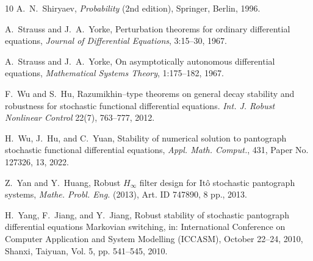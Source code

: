 \documentclass[a4paper,10pt,reqno]{amsart}
\numberwithin{equation}{section}
\theoremstyle{definition}
\theoremstyle{remark}
\DeclareMathOperator{\1}{\mathbbm 1}
\begin{document}
\begin{thebibliography}{10}
A.~N.~Shiryaev, {\em Probability} (2nd edition), Springer, Berlin, 1996.

A.~Strauss and J.~A.~Yorke, Perturbation theorems for ordinary differential equations, {\em Journal of Differential Equations}, 3:15--30, 1967.

A.~Strauss and J.~A.~Yorke, On asymptotically autonomous differential equations,
{\em Mathematical Systems Theory}, 1:175--182, 1967.

 F.~Wu and S.~Hu, Razumikhin--type theorems on general decay stability and robustness for stochastic
functional differential equations. {\em Int. J. Robust Nonlinear Control} 22(7), 763--777, 2012.

H.~Wu, J.~Hu, and C.~Yuan, Stability of numerical solution to pantograph stochastic functional differential equations, {\em Appl. Math. Comput.}, 431, Paper No. 127326, 13, 2022.

Z.~Yan and Y.~Huang, Robust $H_\infty$ filter design for It\^o stochastic pantograph systems, {\em Mathe. Probl. Eng.} (2013), Art. ID 747890, 8 pp., 2013.

H.~Yang, F.~Jiang, and Y.~Jiang, Robust stability of stochastic pantograph differential equations Markovian switching, in: International Conference on Computer Application and System Modelling (ICCASM), October 22–24, 2010, Shanxi, Taiyuan, Vol. 5, pp. 541--545, 2010. 
\end{thebibliography}


\end{document}
